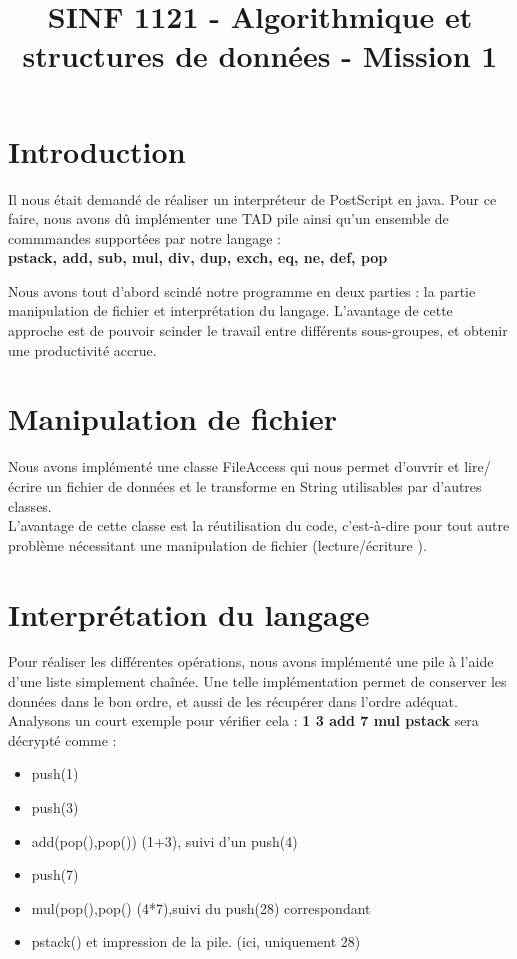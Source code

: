 \documentclass{article}
\begin{document}
\title{SINF 1121 - Algorithmique et structures de données - Mission 1}
\maketitle
\section*{Introduction}
Il nous était demandé de réaliser un interpréteur de PostScript en java. Pour ce faire, nous avons dû implémenter une TAD pile ainsi qu'un ensemble de commmandes supportées par notre langage : \\

\textbf{pstack, add, sub, mul, div, dup, exch, eq, ne, def, pop }

Nous avons tout d'abord scindé notre programme en deux parties : la partie manipulation de fichier et interprétation du langage. 
L'avantage de cette approche est de pouvoir scinder le travail entre différents sous-groupes, et obtenir une productivité accrue.
\section*{Manipulation de fichier}
Nous avons implémenté une classe FileAccess qui nous permet d'ouvrir et lire/écrire un fichier de données et le transforme en String utilisables par d'autres classes.\\ 
L'avantage de cette classe est la réutilisation du code, c'est-à-dire pour tout autre problème nécessitant une manipulation de fichier (lecture/écriture ).
\section*{Interprétation du langage}
Pour réaliser les différentes opérations, nous avons implémenté une pile à l'aide d'une liste simplement chaînée. Une telle implémentation permet de conserver les données dans le bon ordre, et aussi de les récupérer dans l'ordre adéquat.\\
Analysons un court exemple pour vérifier cela : 
\textbf{1 3 add 7 mul pstack} sera décrypté comme :\\
\begin{itemize}
\item push(1)
\item push(3)
\item add(pop(),pop()) (1+3), suivi d'un push(4)
\item push(7)
\item mul(pop(),pop() (4*7),suivi du push(28) correspondant
\item pstack() et impression de la pile. (ici, uniquement 28)

\end{itemize}
\end{document}

